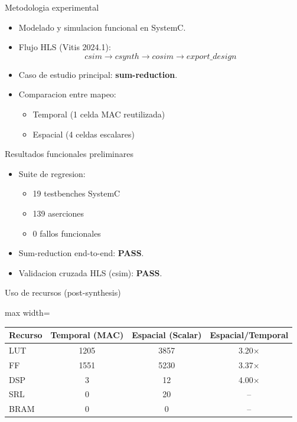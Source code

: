 \documentclass[aspectratio=169]{beamer}
\begin{document}
\begin{frame}{Metodologia experimental}
\begin{itemize}
  \item Modelado y simulacion funcional en SystemC.
  \item Flujo HLS (Vitis 2024.1):
  \[
  csim \rightarrow csynth \rightarrow cosim \rightarrow export\_design
  \]
  \item Caso de estudio principal: \textbf{sum-reduction}.
  \item Comparacion entre mapeo:
  \begin{itemize}
    \item Temporal (1 celda MAC reutilizada)
    \item Espacial (4 celdas escalares)
  \end{itemize}
\end{itemize}
\end{frame}

\begin{frame}{Resultados funcionales preliminares}
\begin{itemize}
  \item Suite de regresion:
  \begin{itemize}
    \item 19 testbenches SystemC
    \item 139 aserciones
    \item 0 fallos funcionales
  \end{itemize}
  \item Sum-reduction end-to-end: \textbf{PASS}.
  \item Validacion cruzada HLS (csim): \textbf{PASS}.
\end{itemize}
\end{frame}

\begin{frame}{Uso de recursos (post-synthesis)}
\begin{table}[htbp]
\centering
\scriptsize
\begin{adjustbox}{max width=\linewidth}
\begin{tabular}{@{}lccc@{}}
\toprule
\textbf{Recurso} & \textbf{Temporal (MAC)} & \textbf{Espacial (Scalar)} & \textbf{Espacial/Temporal} \\
\midrule
LUT  & 1205 & 3857 & 3.20$\times$ \\
FF   & 1551 & 5230 & 3.37$\times$ \\
DSP  & 3    & 12   & 4.00$\times$ \\
SRL  & 0    & 20   & -- \\
BRAM & 0    & 0    & -- \\
\bottomrule
\end{tabular}
\end{adjustbox}
\end{table}
\end{frame}
\end{document}
